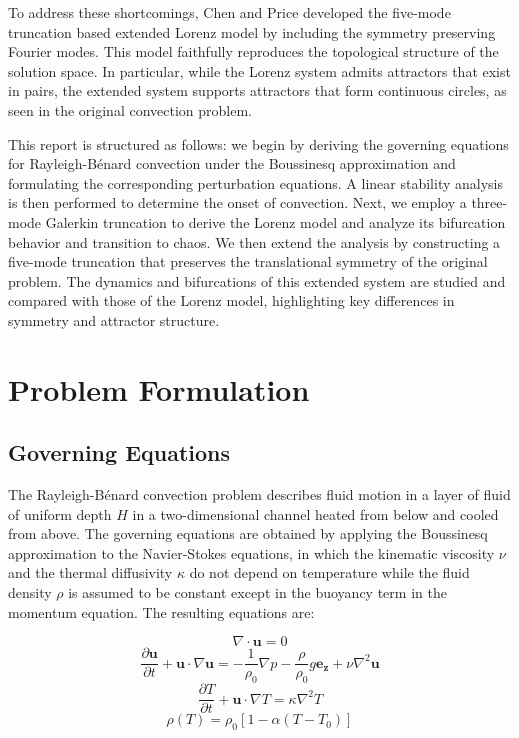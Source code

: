 \documentclass[paper=a4, fontsize=11pt]{scrartcl}
\numberwithin{equation}{section}		%
\numberwithin{figure}{section}			%
\numberwithin{table}{section}				%
\begin{document}
To address these shortcomings, Chen and Price \cite{chen2006} developed the five-mode truncation based extended Lorenz model by including the symmetry preserving Fourier modes. This model faithfully reproduces the topological structure of the solution space. In particular, while the Lorenz system admits attractors that exist in pairs, the extended system supports attractors that form continuous circles, as seen in the original convection problem.

This report is structured as follows: we begin by deriving the governing equations for Rayleigh-Bénard convection under the Boussinesq approximation and formulating the corresponding perturbation equations. A linear stability analysis is then performed to determine the onset of convection. Next, we employ a three-mode Galerkin truncation to derive the Lorenz model and analyze its bifurcation behavior and transition to chaos. We then extend the analysis by constructing a five-mode truncation that preserves the translational symmetry of the original problem. The dynamics and bifurcations of this extended system are studied and compared with those of the Lorenz model, highlighting key differences in symmetry and attractor structure.


\section{Problem Formulation}

\subsection{Governing Equations}
The Rayleigh-B\'enard convection problem describes fluid motion in a layer of fluid of uniform depth $H$ in a two-dimensional channel heated from below and cooled from above. The governing equations are obtained by applying the Boussinesq approximation to the Navier-Stokes equations, in which the kinematic viscosity $\nu$ and the thermal diffusivity $\kappa$ do not depend on temperature while the fluid density $\rho$ is assumed to be constant except in the buoyancy term in the momentum equation. The resulting equations are:

\begin{equation}
	\nabla \cdot \mathbf{u} = 0
	\label{continuityeqn}
\end{equation}
\begin{equation}
	\frac{\partial \mathbf{u}}{\partial t} + \mathbf{u} \cdot \nabla \mathbf{u} = - \frac{1}{\rho_0} \nabla p - \frac{\rho}{\rho_0}g \mathbf{e_z} + \nu \nabla^2 \mathbf{u} 
	\label{momentumeqn}
\end{equation}
\begin{equation}
	\frac{\partial T}{\partial t} + \mathbf{u} \cdot \nabla T = \kappa \nabla^2 T 
	\label{temperatureeqn}
\end{equation}
\begin{equation}
	\rho(T) = \rho_0 [1-\alpha(T-T_0)]
	\label{stateeqn}
\end{equation}
\end{document}
